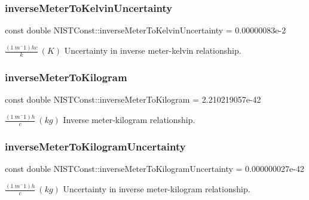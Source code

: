 \subsubsection{\texorpdfstring{inverse\+Meter\+To\+Kelvin\+Uncertainty}{inverseMeterToKelvinUncertainty}}
{\footnotesize\ttfamily const double N\+I\+S\+T\+Const\+::inverse\+Meter\+To\+Kelvin\+Uncertainty = 0.\+00000083e-\/2}

$\frac{(1\ m^-1)hc}{k} \ (K)$ Uncertainty in inverse meter-\/kelvin relationship. \mbox{\label{group___n_i_s_t_const-_inverse_meter_ga6b5807b2161fa29684e4862e575b9102}} 
\subsubsection{\texorpdfstring{inverse\+Meter\+To\+Kilogram}{inverseMeterToKilogram}}
{\footnotesize\ttfamily const double N\+I\+S\+T\+Const\+::inverse\+Meter\+To\+Kilogram = 2.\+210219057e-\/42}

$\frac{(1\ m^-1)h}{c} \ (kg)$ Inverse meter-\/kilogram relationship. \mbox{\label{group___n_i_s_t_const-_inverse_meter_gaedbe76575234cd5252d6a4b2ef8db104}} 
\subsubsection{\texorpdfstring{inverse\+Meter\+To\+Kilogram\+Uncertainty}{inverseMeterToKilogramUncertainty}}
{\footnotesize\ttfamily const double N\+I\+S\+T\+Const\+::inverse\+Meter\+To\+Kilogram\+Uncertainty = 0.\+000000027e-\/42}

$\frac{(1\ m^-1)h}{c} \ (kg)$ Uncertainty in inverse meter-\/kilogram relationship. 